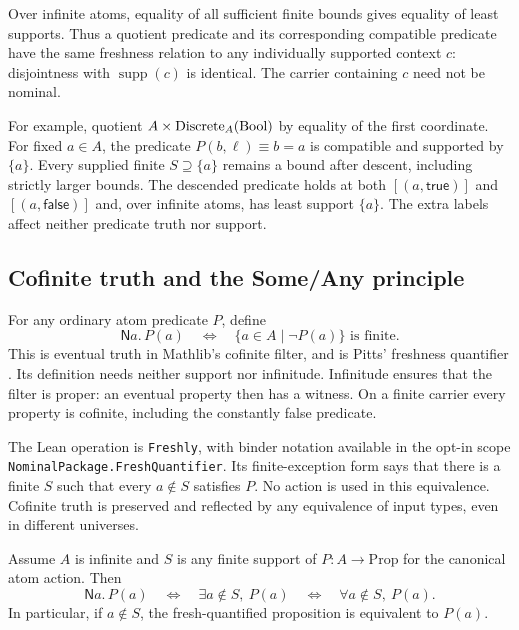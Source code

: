 Over infinite atoms, equality of all sufficient finite bounds gives equality
of least supports. Thus a quotient predicate and its corresponding compatible
predicate have the same freshness relation to any individually supported
context $c$: disjointness with $\operatorname{supp}(c)$ is identical. The carrier containing
$c$ need not be nominal.

For example, quotient $A\times\operatorname{Discrete}_A(\mathrm{Bool})$ by equality of the first
coordinate. For fixed $a\in A$, the predicate $P(b,\ell)\equiv b=a$ is
compatible and supported by $\{a\}$. Every supplied finite
$S\supseteq\{a\}$ remains a bound after descent, including strictly larger
bounds. The descended predicate holds at both $[(a,\mathsf{true})]$ and
$[(a,\mathsf{false})]$ and, over infinite atoms, has least support $\{a\}$.
The extra labels affect neither predicate truth nor support.

\subsection{Cofinite truth and the Some/Any principle}
\label{sec:some-any}

For any ordinary atom predicate $P$, define
\[
  \mathsf N a.\,P(a)
  \quad\Longleftrightarrow\quad
  \{a\in A\mid\neg P(a)\}\text{ is finite}.
\]
This is eventual truth in Mathlib's cofinite filter, and is Pitts'
freshness quantifier \cite[Definition~3.8]{pitts2013}. Its definition needs
neither support nor infinitude. Infinitude ensures that the filter is proper:
an eventual property then has a witness. On a finite carrier every property
is cofinite, including the constantly false predicate.

The Lean operation is \texttt{Freshly}, with binder notation available in the
opt-in scope \texttt{NominalPackage.FreshQuantifier}. Its finite-exception
form says that there is a finite $S$ such that every $a\notin S$ satisfies
$P$. No action is used in this equivalence. Cofinite truth is preserved and
reflected by any equivalence of input types, even in different universes.

\begin{proposition}
\label{prop:some-any-bound}
Assume $A$ is infinite and $S$ is any finite support of $P:A\to\mathrm{Prop}$
for the canonical atom action. Then
\[
  \mathsf N a.\,P(a)
  \quad\Longleftrightarrow\quad
  \exists a\notin S,\ P(a)
  \quad\Longleftrightarrow\quad
  \forall a\notin S,\ P(a).
\]
In particular, if $a\notin S$, the fresh-quantified proposition is equivalent
to $P(a)$.
\end{proposition}

